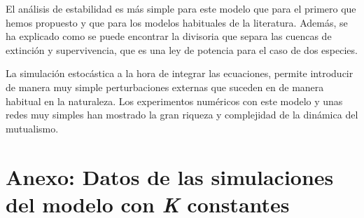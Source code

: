 El análisis de estabilidad es más simple para este modelo que para el primero que hemos propuesto y que para los modelos habituales de la literatura. Además, se ha explicado como se puede encontrar la divisoria que separa las cuencas de extinción y supervivencia, que es una ley de potencia para el caso de dos especies.

La simulación estocástica a la hora de integrar las ecuaciones, permite introducir de manera muy simple perturbaciones externas que suceden en de manera habitual en la naturaleza. Los experimentos numéricos con este modelo y unas redes muy simples han mostrado la gran riqueza y complejidad de la dinámica del mutualismo.

\clearpage
\section{Anexo: Datos de las simulaciones del modelo con \textit{K} constantes}
\label{DINAMICA_ANEXO_KConst}

